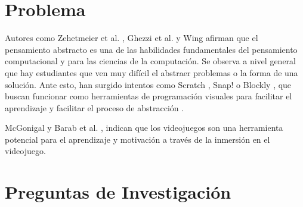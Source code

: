\documentclass[submission]{eptcs}
\begin{document}






\section{Problema}


Autores como Zehetmeier et al. \cite{abstract_thinking_cs}, Ghezzi et al. \cite{fundamentals_software_abstract} y Wing \cite{wingresearch_abstract} afirman
que el pensamiento abstracto es una de las habilidades fundamentales del pensamiento computacional
y para las ciencias de la computación. Se observa a nivel general que hay estudiantes que ven muy difícil
el abstraer problemas o la forma de una solución. Ante esto, han surgido intentos como Scratch \cite{scratch}, Snap! o 
Blockly \cite{Blockly}, que buscan funcionar como herramientas de programación visuales para facilitar
el aprendizaje y facilitar el proceso de abstracción \cite{programming_education}.

McGonigal \cite{games_makes_us_better} y Barab et al. \cite{barab2009transformational}, indican que los videojuegos son
una herramienta potencial para el aprendizaje y motivación a través de la inmersión en el videojuego. 


\section{Preguntas de Investigación}
\end{document}
